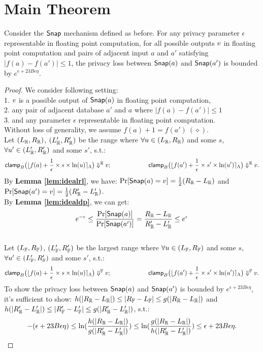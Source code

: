 \documentclass[a4paper,11pt]{article}
\begin{document}
\newpage
\section{Main Theorem}

\begin{thm}
%
Consider the $\mathsf{Snap}$ mechanism defined as before. For any privacy parameter $\epsilon$ representable in floating point computation, for all possible outputs $v$ in floating point computation and pairs of adjacent input $a$ and $a'$ satisfying $|f(a) - f(a')| \leq 1$, the privacy loss between $\mathsf{Snap}(a)$ and $\mathsf{Snap}(a')$ is bounded by $e^{\epsilon + 23 B \epsilon \eta}$.
\end{thm}

\begin{proof}
%
%
We consider following setting:
\\
1. $v$ is a possible output of $\mathsf{Snap}(a)$ in floating point computation,
%
\\
2. any pair of adjacent database $a'$ and $a$ where $|f(a) - f(a')| \leq 1$
%
\\
3. and any parameter $\epsilon$ representable in floating point computation.
%
\\
Without loss of generality, we assume $f(a) + 1 = f(a') ~ (\diamond)$.
%
\\
%
%
Let $(L_{\mathbb{R}}, R_{\mathbb{R}})$, $(L_{\mathbb{R}}', R_{\mathbb{R}}')$ be the range where 
$\forall u \in (L_{\mathbb{R}}, R_{\mathbb{R}})$ and some $s$, 
$\forall u' \in (L_{\mathbb{R}}', R_{\mathbb{R}}')$ and some $s'$, s.t.:
%
$$\mathsf{clamp}_B \big(
	\lfloor f(a) + \frac{1}{\epsilon} \times s \times \ln (u) \rceil_{\Lambda}
	\big)
	 \Downarrow^{\mathbb{R}} v; 
~~~~~~~~~~~~~~~~~~
\mathsf{clamp}_B \big(
	\lfloor f(a') + \frac{1}{\epsilon} \times s' \times \ln (u') \rceil_{\Lambda}
	\big)
	 \Downarrow^{\mathbb{R}} v.$$
%
By \textbf{Lemma \ref{lem:idealrl}}, we have:
$\Pr[\mathsf{Snap}(a) = v] = \frac{1}{2} (R_{\mathbb{R}} - L_{\mathbb{R}})$ 
and $\Pr[\mathsf{Snap}(a') = v] = \frac{1}{2} (R_{\mathbb{R}}' - L_{\mathbb{R}}')$.
%
\\
%
By \textbf{Lemma \ref{lem:idealdp}}, we can get:
\[
	e^{-\epsilon} \leq \frac{\Pr[\mathsf{Snap}(a)]}{\Pr[\mathsf{Snap}(a')]}
	= \frac{R_{\mathbb{R}} - L_{\mathbb{R}}}{R_{\mathbb{R}}' - L_{\mathbb{R}}'} \leq e^{\epsilon}
\]
%
\\
%
Let $(L_{\mathbb{F}}, R_{\mathbb{F}})$, $(L_{\mathbb{F}}', R_{\mathbb{F}}')$ be the largest range where 
$\forall u \in (L_{\mathbb{F}}, R_{\mathbb{F}})$ and some $s$, 
$\forall u' \in (L_{\mathbb{F}}', R_{\mathbb{F}}')$ and some $s'$, s.t.:
%
$$
\mathsf{clamp}_B \big(
	\lfloor f(a) + \frac{1}{\epsilon} \times s \times \ln (u) \rceil_{\Lambda}
	\big)
	\Downarrow^{\mathbb{F}} v; 
~~~~~~~~~~~~~~~~~~
\mathsf{clamp}_B \big(
	\lfloor f(a') + \frac{1}{\epsilon} \times s' \times \ln (u') \rceil_{\Lambda}
	\big)
	\Downarrow^{\mathbb{F}} v.$$
%
To show the privacy loss between $\mathsf{Snap}(a)$ and $\mathsf{Snap}(a')$ is bounded by $e^{\epsilon + 23 B \epsilon \eta}$, it’s sufficient to show:
%
%
$h(|{R_{\mathbb{R}}} - {L_{\mathbb{R}}}|) \leq |R_{\mathbb{F}} - L_{\mathbb{F}}| \leq g(|{R_{\mathbb{R}}} - {L_{\mathbb{R}}}|)$ and 
$h(|{R_{\mathbb{R}}'} - {L_{\mathbb{R}}'}|) \leq |R_{\mathbb{F}}' - L_{\mathbb{F}}'|
\leq g(|{R_{\mathbb{R}}'} - {L_{\mathbb{R}}'}|) $,
%
s.t.:
%
\[
	-(\epsilon + 23 B \epsilon \eta)
	\leq \ln( \frac{h(|{R_{\mathbb{R}}} - {L_{\mathbb{R}}}|)}{g(|{R_{\mathbb{R}}'} - {L_{\mathbb{R}}'}|)} ) 
	\leq
	\ln( \frac{g(|{R_{\mathbb{R}}} - {L_{\mathbb{R}}}|)}{h(|{R_{\mathbb{R}}'} - {L_{\mathbb{R}}'}|)} )
	\leq \epsilon + 23 B \epsilon \eta.
\]


\end{proof}
\end{document}
